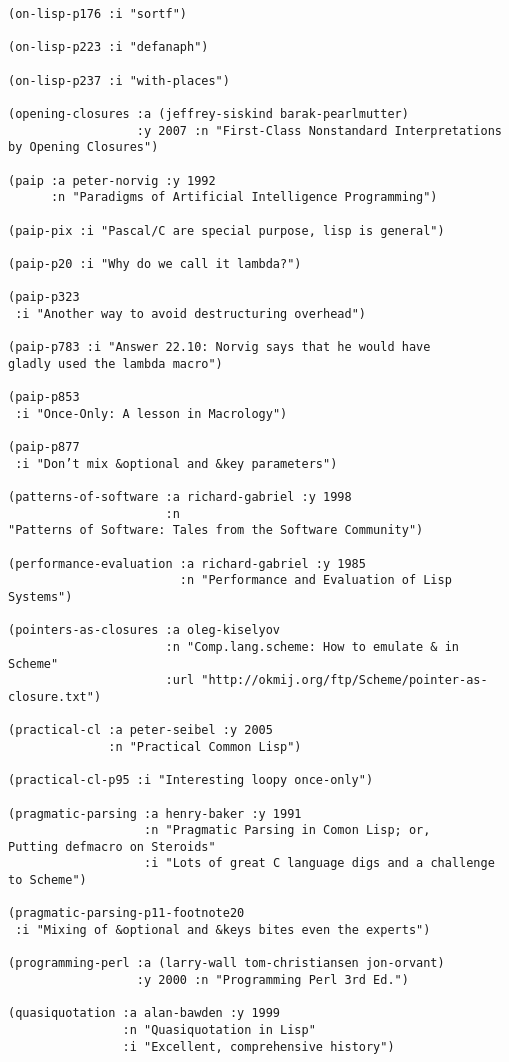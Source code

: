 \begin{verbatim}
(on-lisp-p176 :i "sortf")

(on-lisp-p223 :i "defanaph")

(on-lisp-p237 :i "with-places")

(opening-closures :a (jeffrey-siskind barak-pearlmutter)
                  :y 2007 :n "First-Class Nonstandard Interpretations
by Opening Closures")

(paip :a peter-norvig :y 1992
      :n "Paradigms of Artificial Intelligence Programming")

(paip-pix :i "Pascal/C are special purpose, lisp is general")

(paip-p20 :i "Why do we call it lambda?")

(paip-p323
 :i "Another way to avoid destructuring overhead")

(paip-p783 :i "Answer 22.10: Norvig says that he would have
gladly used the lambda macro")

(paip-p853
 :i "Once-Only: A lesson in Macrology")

(paip-p877
 :i "Don’t mix &optional and &key parameters")

(patterns-of-software :a richard-gabriel :y 1998
                      :n
"Patterns of Software: Tales from the Software Community")

(performance-evaluation :a richard-gabriel :y 1985
                        :n "Performance and Evaluation of Lisp Systems")

(pointers-as-closures :a oleg-kiselyov
                      :n "Comp.lang.scheme: How to emulate & in Scheme"
                      :url "http://okmij.org/ftp/Scheme/pointer-as-closure.txt")

(practical-cl :a peter-seibel :y 2005
              :n "Practical Common Lisp")

(practical-cl-p95 :i "Interesting loopy once-only")

(pragmatic-parsing :a henry-baker :y 1991
                   :n "Pragmatic Parsing in Comon Lisp; or,
Putting defmacro on Steroids"
                   :i "Lots of great C language digs and a challenge to Scheme")

(pragmatic-parsing-p11-footnote20
 :i "Mixing of &optional and &keys bites even the experts")

(programming-perl :a (larry-wall tom-christiansen jon-orvant)
                  :y 2000 :n "Programming Perl 3rd Ed.")

(quasiquotation :a alan-bawden :y 1999
                :n "Quasiquotation in Lisp"
                :i "Excellent, comprehensive history")


\end{verbatim}
